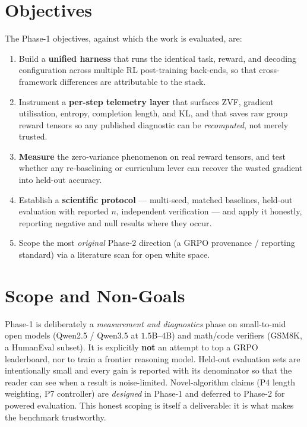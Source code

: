 \documentclass[12pt,a4paper]{report}
\begin{document}
\section{Objectives}
The Phase-1 objectives, against which the work is evaluated, are:
\begin{enumerate}[leftmargin=1.6em,itemsep=2pt]
  \item Build a \textbf{unified harness} that runs the identical task, reward, and
  decoding configuration across multiple RL post-training back-ends, so that
  cross-framework differences are attributable to the stack.
  \item Instrument a \textbf{per-step telemetry layer} that surfaces ZVF, gradient
  utilisation, entropy, completion length, and KL, and that saves raw group reward
  tensors so any published diagnostic can be \emph{recomputed}, not merely trusted.
  \item \textbf{Measure} the zero-variance phenomenon on real reward tensors, and
  test whether any re-baselining or curriculum lever can recover the wasted
  gradient into held-out accuracy.
  \item Establish a \textbf{scientific protocol} --- multi-seed, matched baselines,
  held-out evaluation with reported $n$, independent verification --- and apply it
  honestly, reporting negative and null results where they occur.
  \item Scope the most \emph{original} Phase-2 direction (a GRPO provenance /
  reporting standard) via a literature scan for open white space.
\end{enumerate}

\section{Scope and Non-Goals}
Phase-1 is deliberately a \emph{measurement and diagnostics} phase on small-to-mid
open models (Qwen2.5 / Qwen3.5 at $1.5$B--$4$B) and math/code verifiers (GSM8K,
a HumanEval subset). It is explicitly \textbf{not} an attempt to top a GRPO
leaderboard, nor to train a frontier reasoning model. Held-out evaluation sets are
intentionally small and every gain is reported with its denominator so that the
reader can see when a result is noise-limited. Novel-algorithm claims (P4 length
weighting, P7 controller) are \emph{designed} in Phase-1 and deferred to Phase-2
for powered evaluation. This honest scoping is itself a deliverable: it is what
makes the benchmark trustworthy.
\end{document}
